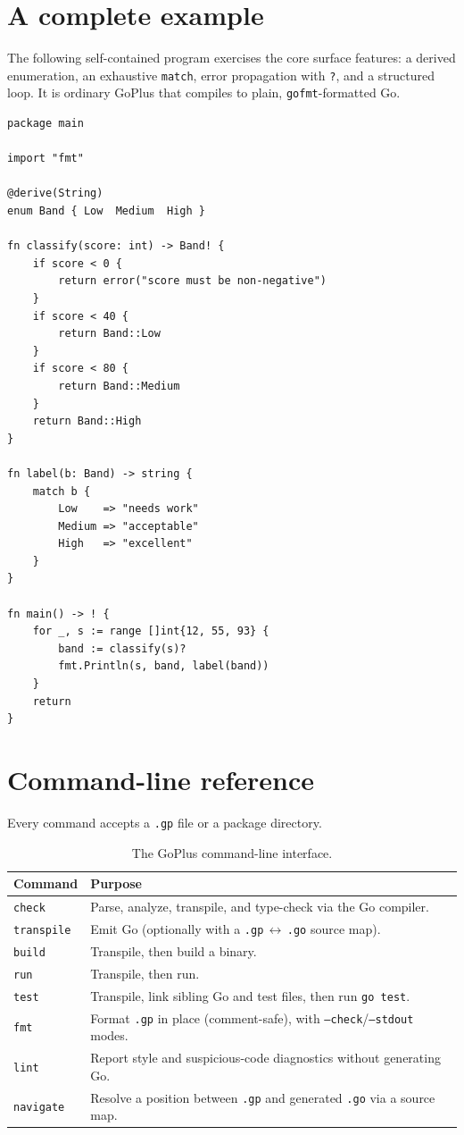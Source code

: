 \documentclass[11pt,a4paper]{article}
\begin{document}
\clearpage
\appendix
\section{A complete example}
The following self-contained program exercises the core surface features:
a derived enumeration, an exhaustive \texttt{match}, error propagation with
\texttt{?}, and a structured loop. It is ordinary GoPlus that compiles to plain,
\texttt{gofmt}-formatted Go.

\begin{lstlisting}[language=GoPlus,caption={A small, complete GoPlus program.}]
package main

import "fmt"

@derive(String)
enum Band { Low  Medium  High }

fn classify(score: int) -> Band! {
    if score < 0 {
        return error("score must be non-negative")
    }
    if score < 40 {
        return Band::Low
    }
    if score < 80 {
        return Band::Medium
    }
    return Band::High
}

fn label(b: Band) -> string {
    match b {
        Low    => "needs work"
        Medium => "acceptable"
        High   => "excellent"
    }
}

fn main() -> ! {
    for _, s := range []int{12, 55, 93} {
        band := classify(s)?
        fmt.Println(s, band, label(band))
    }
    return
}
\end{lstlisting}

\section{Command-line reference}
Every command accepts a \texttt{.gp} file or a package directory.

\begin{table}[ht]
\centering
\renewcommand{\arraystretch}{1.25}
\begin{tabularx}{\textwidth}{@{}l X@{}}
\toprule
\textbf{\color{hustred}Command} & \textbf{\color{hustred}Purpose} \\
\midrule
\texttt{check}     & Parse, analyze, transpile, and type-check via the Go compiler. \\
\texttt{transpile} & Emit Go (optionally with a \texttt{.gp}\,\(\leftrightarrow\)\,\texttt{.go} source map). \\
\texttt{build}     & Transpile, then build a binary. \\
\texttt{run}       & Transpile, then run. \\
\texttt{test}      & Transpile, link sibling Go and test files, then run \texttt{go test}. \\
\texttt{fmt}       & Format \texttt{.gp} in place (comment-safe), with \texttt{--check}/\texttt{--stdout} modes. \\
\texttt{lint}      & Report style and suspicious-code diagnostics without generating Go. \\
\texttt{navigate}  & Resolve a position between \texttt{.gp} and generated \texttt{.go} via a source map. \\
\bottomrule
\end{tabularx}
\caption{The GoPlus command-line interface.}
\end{table}
\end{document}
